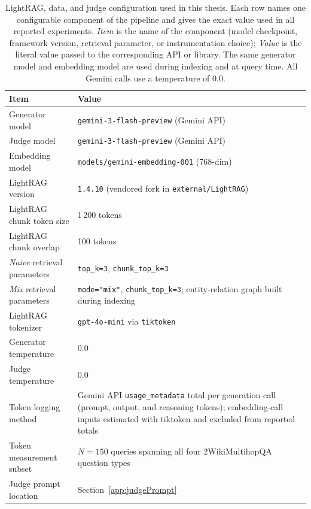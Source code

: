 \documentclass[english, bibtex]{kththesis}               %
\numberwithin{listing}{chapter}
\begin{document}
\begin{table}[!ht]
\centering
\caption{LightRAG, data, and judge configuration used in this thesis. Each row names one configurable component of the pipeline and gives the exact value used in all reported experiments. \emph{Item} is the name of the component (model checkpoint, framework version, retrieval parameter, or instrumentation choice); \emph{Value} is the literal value passed to the corresponding API or library. The same generator model and embedding model are used during indexing and at query time. All Gemini calls use a temperature of $0.0$.}
\label{tab:lightragDataJudgeConfig}
\begin{tabularx}{\textwidth}{p{}|X}
\textbf{Item} & \textbf{Value} \\
\hline
Generator model & \texttt{gemini-3-flash-preview} (Gemini API) \\
Judge model & \texttt{gemini-3-flash-preview} (Gemini API) \\
Embedding model & \texttt{models/gemini-embedding-001} (768-dim) \\
LightRAG version & \texttt{1.4.10} (vendored fork in \texttt{external/LightRAG}) \\
LightRAG chunk token size & 1\,200 tokens \\
LightRAG chunk overlap & 100 tokens \\
\emph{Naive} retrieval parameters & \texttt{top\_k=3}, \texttt{chunk\_top\_k=3} \\
\emph{Mix} retrieval parameters & \texttt{mode="mix"}, \texttt{chunk\_top\_k=3}; entity-relation graph built during indexing \\
LightRAG tokenizer & \texttt{gpt-4o-mini} via \texttt{tiktoken} \\
Generator temperature & 0.0 \\
Judge temperature & 0.0 \\
Token logging method & Gemini API \texttt{usage\_metadata} total per generation call (prompt, output, and reasoning tokens); embedding-call inputs estimated with tiktoken and excluded from reported totals \\
Token measurement subset & \(N = 150\) queries spanning all four 2WikiMultihopQA question types \\
Judge prompt location & Section~\ref{app:judgePrompt} \\
\end{tabularx}
\end{table}
\end{document}
